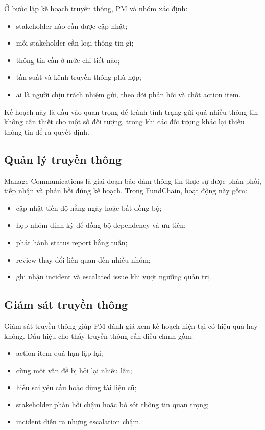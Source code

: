 Ở bước lập kế hoạch truyền thông, PM và nhóm xác định:

\begin{itemize}
  \item stakeholder nào cần được cập nhật;
  \item mỗi stakeholder cần loại thông tin gì;
  \item thông tin cần ở mức chi tiết nào;
  \item tần suất và kênh truyền thông phù hợp;
  \item ai là người chịu trách nhiệm gửi, theo dõi phản hồi và chốt action item.
\end{itemize}

Kế hoạch này là đầu vào quan trọng để tránh tình trạng gửi quá nhiều thông tin không cần thiết cho một số đối tượng, trong khi các đối tượng khác lại thiếu thông tin để ra quyết định.

\subsection{Quản lý truyền thông}

Manage Communications là giai đoạn bảo đảm thông tin thực sự được phân phối, tiếp nhận và phản hồi đúng kế hoạch. Trong FundChain, hoạt động này gồm:

\begin{itemize}
  \item cập nhật tiến độ hằng ngày hoặc bất đồng bộ;
  \item họp nhóm định kỳ để đồng bộ dependency và ưu tiên;
  \item phát hành status report hằng tuần;
  \item review thay đổi liên quan đến nhiều nhóm;
  \item ghi nhận incident và escalated issue khi vượt ngưỡng quản trị.
\end{itemize}

\subsection{Giám sát truyền thông}

Giám sát truyền thông giúp PM đánh giá xem kế hoạch hiện tại có hiệu quả hay không. Dấu hiệu cho thấy truyền thông cần điều chỉnh gồm:

\begin{itemize}
  \item action item quá hạn lặp lại;
  \item cùng một vấn đề bị hỏi lại nhiều lần;
  \item hiểu sai yêu cầu hoặc dùng tài liệu cũ;
  \item stakeholder phản hồi chậm hoặc bỏ sót thông tin quan trọng;
  \item incident diễn ra nhưng escalation chậm.
\end{itemize}

